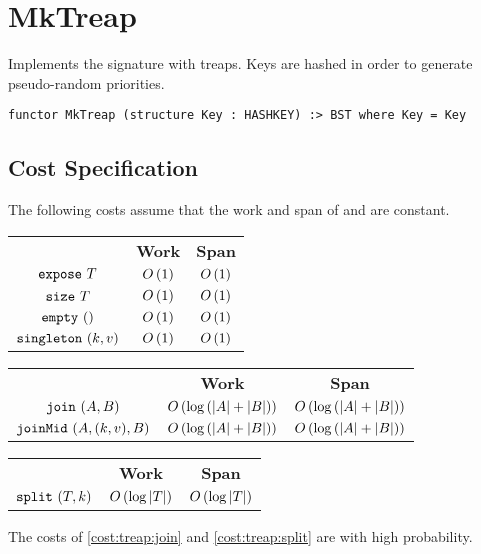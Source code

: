 \chapter{MkTreap}
\label{ch:treap-bst}
\begin{preamble}
Implements the  signature with treaps. Keys are hashed in order to
generate pseudo-random priorities.
\begin{verbatim}
functor MkTreap (structure Key : HASHKEY) :> BST where Key = Key
\end{verbatim}
\end{preamble}

\section{Cost Specification}

\begin{gram}
The following costs assume that the work and span of 
and  are constant.
\end{gram}

\begin{costspec}
\begin{tabular}{c|c|c}
& \textbf{Work} & \textbf{Span} \\
$\texttt{expose}~T$ & $O\left({1}\right)$ & $O\left({1}\right)$ \\
$\texttt{size}~T$ & $O\left({1}\right)$ & $O\left({1}\right)$ \\
$\texttt{empty}~()$ & $O\left({1}\right)$ & $O\left({1}\right)$ \\
$\texttt{singleton}~(k,v)$ & $O\left({1}\right)$ & $O\left({1}\right)$
\end{tabular}
\end{costspec}

\begin{costspec}[Join]
\label{cost:treap:join}
\begin{tabular}{c|c|c}
& \textbf{Work} & \textbf{Span} \\
$\texttt{join}~(A,B)$ & $O\left({\log\left(|A| + |B|\right)}\right)$ & $O\left({\log\left(|A| + |B|\right)}\right)$ \\
$\texttt{joinMid}~(A,(k,v),B)$ & $O\left({\log\left(|A| + |B|\right)}\right)$ & $O\left({\log\left(|A| + |B|\right)}\right)$
\end{tabular}
\end{costspec}

\begin{costspec}[Split]
\label{cost:treap:split}
\begin{tabular}{c|c|c}
& \textbf{Work} & \textbf{Span} \\
$\texttt{split}~(T,k)$ & $O\left({\log|T|}\right)$ & $O\left({\log|T|}\right)$
\end{tabular}
\end{costspec}

\begin{note}
The costs of \ref{cost:treap:join} and \ref{cost:treap:split} are with
high probability.
\end{note}

